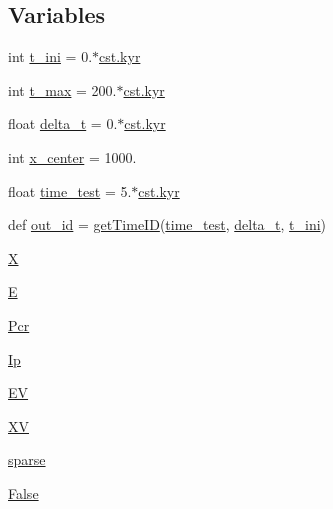 \subsection*{Variables}
\begin{DoxyCompactItemize}
\item 
int \hyperlink{namespacepcr__ip__2D_a335b9e411d312c5928c1db82c0cf64cb}{t\+\_\+ini} = 0.$\ast$\hyperlink{constants_8h_a0edf155739e92555799f4a04b10af6bf}{cst.\+kyr}
\item 
int \hyperlink{namespacepcr__ip__2D_a8c953897bfcfd481d5004446a6d95e9d}{t\+\_\+max} = 200.$\ast$\hyperlink{constants_8h_a0edf155739e92555799f4a04b10af6bf}{cst.\+kyr}
\item 
float \hyperlink{namespacepcr__ip__2D_a15848a5cc643f9e16f7c40d29f7540df}{delta\+\_\+t} = 0.$\ast$\hyperlink{constants_8h_a0edf155739e92555799f4a04b10af6bf}{cst.\+kyr}
\item 
int \hyperlink{namespacepcr__ip__2D_a5f81ee95156f4676e4e6bd159c2ec79e}{x\+\_\+center} = 1000.
\item 
float \hyperlink{namespacepcr__ip__2D_a2f5bdb13fbded2c22c90cde6e8cc41e7}{time\+\_\+test} = 5.$\ast$\hyperlink{constants_8h_a0edf155739e92555799f4a04b10af6bf}{cst.\+kyr}
\item 
def \hyperlink{namespacepcr__ip__2D_a94fd3b69fd6b2e69c685881382986390}{out\+\_\+id} = \hyperlink{namespacepcr__ip__2D_a5b61f4fcc6e641b5bb012f573b0495b3}{get\+Time\+ID}(\hyperlink{namespacepcr__ip__2D_a2f5bdb13fbded2c22c90cde6e8cc41e7}{time\+\_\+test}, \hyperlink{namespacepcr__ip__2D_a15848a5cc643f9e16f7c40d29f7540df}{delta\+\_\+t}, \hyperlink{namespacepcr__ip__2D_a335b9e411d312c5928c1db82c0cf64cb}{t\+\_\+ini})
\item 
\hyperlink{namespacepcr__ip__2D_ac51ea870fde0db138bc5085895755457}{X}
\item 
\hyperlink{namespacepcr__ip__2D_a3cad374eb04d798f03910f866dea2e26}{E}
\item 
\hyperlink{namespacepcr__ip__2D_a0709cd4d093eccbf25a46d0b15d0dd86}{Pcr}
\item 
\hyperlink{namespacepcr__ip__2D_a585cc4fbd898d4face7a2b37f0ad6636}{Ip}
\item 
\hyperlink{namespacepcr__ip__2D_a3ff07a36f29a76c8b68c1f1d2c27e93c}{EV}
\item 
\hyperlink{namespacepcr__ip__2D_a31b44119623c5fa0707541a727fd6eeb}{XV}
\item 
\hyperlink{namespacepcr__ip__2D_a5fd68a3ad6d6ab7d3f0f0b43df1133f2}{sparse}
\item 
\hyperlink{namespacepcr__ip__2D_a6bc986d9374c782c3c659e7205d62837}{False}

\end{DoxyCompactItemize}
